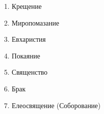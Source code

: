 

\label{_content_vpomoch-kayuchemusya}

 

 
\begin{enumerate}

\item Крещение


\item Миропомазание


\item Евхаристия


\item Покаяние


\item Священство


\item Брак


\item Елеосвящение (Соборование)

\end{enumerate}

\mychapterending

